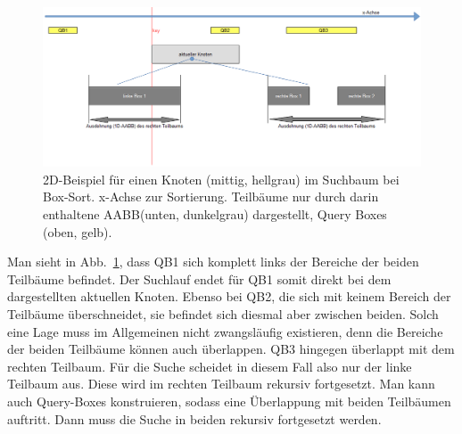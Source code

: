 \begin{figure}
    \centering
    \includegraphics[width=1.0\textwidth]{./res/BoxsortNode.png}
    \caption{2D-Beispiel für einen Knoten (mittig, hellgrau) im Suchbaum bei Box-Sort. x-Achse zur Sortierung. Teilbäume nur durch darin enthaltene AABB(unten, dunkelgrau) dargestellt, Query Boxes (oben, gelb).}
    \label{fig:boxsortNode}
\end{figure}

Man sieht in Abb.~\ref{fig:boxsortNode}, dass QB1 sich komplett links der Bereiche der beiden Teilbäume befindet. Der Suchlauf endet für QB1 somit direkt bei dem dargestellten aktuellen Knoten. Ebenso bei QB2, die sich mit keinem Bereich der Teilbäume überschneidet, sie befindet sich diesmal aber zwischen beiden. Solch eine Lage muss im Allgemeinen nicht zwangsläufig existieren, denn die Bereiche der beiden Teilbäume können auch überlappen. QB3 hingegen überlappt mit dem rechten Teilbaum. Für die Suche scheidet in diesem Fall also nur der linke Teilbaum aus. Diese wird im rechten Teilbaum rekursiv fortgesetzt. Man kann auch Query-Boxes konstruieren, sodass eine Überlappung mit beiden Teilbäumen auftritt. Dann muss die Suche in beiden rekursiv fortgesetzt werden.\\

